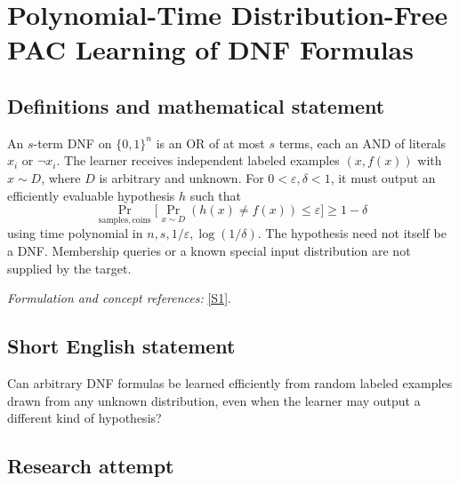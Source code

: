 \documentclass[11pt,a4paper]{article}
\newcommand{\eps}{\varepsilon}
\newcommand{\sref}[2]{\hyperlink{source:#1:#2}{[S#2]}}
\newif\ifshowcatalogue
\newcommand{\cataloguescope}[1]{\ifshowcatalogue
 \paragraph{Exact scope in the supplied catalogue.}
 \begin{quote}\small #1\end{quote}\fi}
\numberwithin{equation}{section}
\begin{document}
\setcounter{section}{0}
\clearpage
\section*{\texorpdfstring{Polynomial-Time Distribution-Free PAC Learning of DNF Formulas}{Polynomial-Time Distribution-Free PAC Learning of DNF Formulas}}\label{30006796}
\subsection{Definitions and mathematical statement}
An $s$-term DNF on $\{0,1\}^n$ is an OR of at most $s$ terms, each an AND of literals $x_i$ or $\neg x_i$. The learner receives independent labeled examples $(x,f(x))$ with $x\sim D$, where $D$ is arbitrary and unknown. For $0<\eps,\delta<1$, it must output an efficiently evaluable hypothesis $h$ such that
\[
 \Pr_{\mathrm{samples,coins}}\bigl[\Pr_{x\sim D}(h(x)\ne f(x))\le\eps\bigr]\ge1-\delta
\]
using time polynomial in $n,s,1/\eps,\log(1/\delta)$. The hypothesis need not itself be a DNF. Membership queries or a known special input distribution are not supplied by the target.
\par\smallskip\textit{Formulation and concept references:} \sref{30006796}{1}.
\cataloguescope{Given an unknown s-term DNF f on \{0,1\}\textasciicircum{}n and random labeled examples drawn from an arbitrary unknown distribution D, construct a possibly improper hypothesis in time polynomial in n, s, 1/epsilon, and log(1/delta) whose D-error is at most epsilon with probability at least 1-delta.}
\subsection{Short English statement}
Can arbitrary DNF formulas be learned efficiently from random labeled examples drawn from any unknown distribution, even when the learner may output a different kind of hypothesis?
\subsection{Research attempt}
\end{document}
